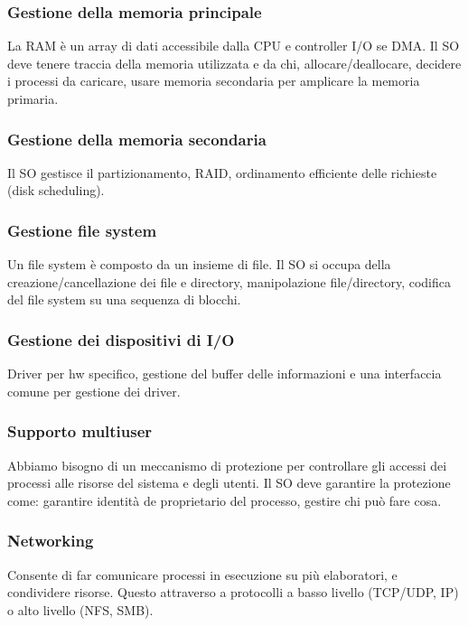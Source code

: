 \documentclass[a4paper,12pt]{article}
\begin{document}
\subsubsection*{Gestione della memoria principale}
La RAM è un array di dati accessibile dalla CPU e controller I/O se DMA. Il SO deve tenere traccia della memoria utilizzata e da chi, allocare/deallocare, decidere i processi da caricare, usare memoria secondaria per amplicare la memoria primaria.
\subsubsection*{Gestione della memoria secondaria}
Il SO gestisce il partizionamento, RAID, ordinamento efficiente delle richieste (disk scheduling).
\subsubsection*{Gestione file system}
Un file system è composto da un insieme di file. Il SO si occupa della creazione/cancellazione dei file e directory, manipolazione file/directory, codifica del file system su una sequenza di blocchi.
\subsubsection*{Gestione dei dispositivi di I/O}
Driver per hw specifico, gestione del buffer delle informazioni e una interfaccia comune per gestione dei driver.
\subsubsection*{Supporto multiuser}
Abbiamo bisogno di un meccanismo di protezione per controllare gli accessi dei processi alle risorse del sistema e degli utenti. Il SO deve garantire la protezione come: garantire identità de proprietario del processo, gestire chi può fare cosa.
\subsubsection*{Networking}
Consente di far comunicare processi in esecuzione su più elaboratori, e condividere risorse. Questo attraverso a protocolli a basso livello (TCP/UDP, IP) o alto livello (NFS, SMB). \\
\vspace{2em}\\
\end{document}
